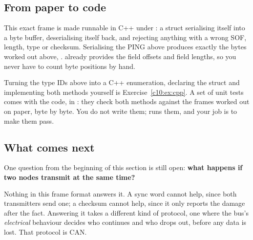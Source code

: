 \subsection*{From paper to code}
This exact frame is made runnable in C++ under : a 
struct serialising itself into a byte buffer, deserialising itself back, and rejecting anything with
a wrong SOF, length, type or checksum. Serialising the PING above produces exactly the bytes worked
out above, .  already provides the field
offsets and field lengths, so you never have to count byte positions by hand.

Turning the type IDs above into a C++ enumeration, declaring the struct and implementing both methods
yourself is Exercise~\ref{c10:ex:cpp}. A set of unit tests comes with the code, in
: they check both methods against the frames worked out on paper, byte by
byte. You do not write them;  runs them, and your job is to make them pass.

\subsection*{What comes next}
One question from the beginning of this section is still open: \textbf{what happens if two nodes
transmit at the same time?}

Nothing in this frame format answers it. A sync word cannot help, since both transmitters send one;
a checksum cannot help, since it only reports the damage after the fact. Answering it takes a
different kind of protocol, one where the bus's \emph{electrical} behaviour decides who continues
and who drops out, before any data is lost. That protocol is CAN.
